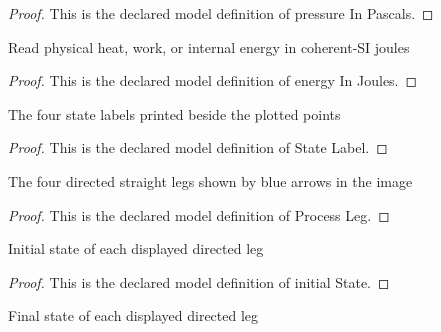 \begin{proof}
  This is the declared model definition of pressure In Pascals.
\end{proof}
\begin{definition}
  \label{def:physics:phyx-mini-0471:phyxminiproblems-problemphyxmini0471-energyinjoules}
  Read physical heat, work, or internal energy in coherent-SI joules
\end{definition}
\begin{proof}
  This is the declared model definition of energy In Joules.
\end{proof}
\begin{definition}
  \label{def:physics:phyx-mini-0471:phyxminiproblems-problemphyxmini0471-statelabel}
  The four state labels printed beside the plotted points
\end{definition}
\begin{proof}
  This is the declared model definition of State Label.
\end{proof}
\begin{definition}
  \label{def:physics:phyx-mini-0471:phyxminiproblems-problemphyxmini0471-processleg}
  The four directed straight legs shown by blue arrows in the image
\end{definition}
\begin{proof}
  This is the declared model definition of Process Leg.
\end{proof}
\begin{definition}
  \label{def:physics:phyx-mini-0471:phyxminiproblems-problemphyxmini0471-processleg-initialstate}
  Initial state of each displayed directed leg
\end{definition}
\begin{proof}
  This is the declared model definition of initial State.
\end{proof}
\begin{definition}
  \label{def:physics:phyx-mini-0471:phyxminiproblems-problemphyxmini0471-processleg-finalstate}
  Final state of each displayed directed leg
\end{definition}
